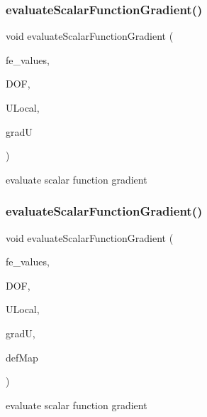 \subsubsection{\texorpdfstring{evaluate\+Scalar\+Function\+Gradient()}{evaluateScalarFunctionGradient()}\hspace{0.1cm}{\footnotesize\ttfamily [1/4]}}
{\footnotesize\ttfamily void evaluate\+Scalar\+Function\+Gradient (\begin{DoxyParamCaption}\item[{const F\+E\+Values$<$ dim $>$ \&}]{fe\+\_\+values,  }\item[{unsigned int}]{D\+OF,  }\item[{Table$<$ 1, T $>$ \&}]{U\+Local,  }\item[{Table$<$ 2, T $>$ \&}]{gradU }\end{DoxyParamCaption})}

evaluate scalar function gradient \mbox{\label{group___evaluation_functions_gabeb71201e8213a7c7616cd8824617f73}} 
\subsubsection{\texorpdfstring{evaluate\+Scalar\+Function\+Gradient()}{evaluateScalarFunctionGradient()}\hspace{0.1cm}{\footnotesize\ttfamily [2/4]}}
{\footnotesize\ttfamily void evaluate\+Scalar\+Function\+Gradient (\begin{DoxyParamCaption}\item[{const F\+E\+Values$<$ dim $>$ \&}]{fe\+\_\+values,  }\item[{unsigned int}]{D\+OF,  }\item[{Table$<$ 1, T $>$ \&}]{U\+Local,  }\item[{Table$<$ 2, T $>$ \&}]{gradU,  }\item[{\mbox{\hyperlink{structdeformation_map}{deformation\+Map}}$<$ T, dim $>$ \&}]{def\+Map }\end{DoxyParamCaption})}

evaluate scalar function gradient \mbox{\label{group___evaluation_functions_ga4622566d0fe19b017cf8d2643ffeb47a}} 

